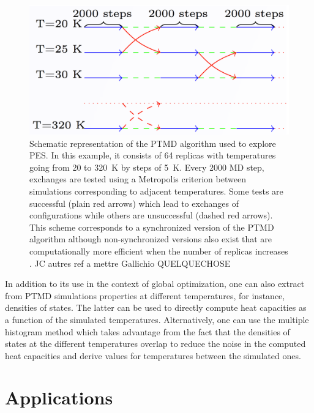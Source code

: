 \documentclass[]{interact}
\theoremstyle{plain}%
\theoremstyle{definition}
\theoremstyle{remark}
\begin{document}
\begin{figure}
\begin{center}
\includegraphics[width=12cm]{ptmd.png}
\end{center}
\caption{Schematic representation of the PTMD algorithm used to explore PES. In this example, it consists of 64 replicas with
temperatures going from 20 to 320~K by steps of 5~K. Every 2000 MD step, exchanges are tested using a Metropolis criterion between
simulations corresponding to adjacent temperatures. Some tests are successful (plain red arrows) which lead to exchanges of configurations
while others are unsuccessful (dashed red arrows). This scheme corresponds to a synchronized version of the PTMD algorithm although
non-synchronized versions also exist that are computationally more efficient when the number of replicas increases \cite{Bussi2008c}. JC autres ref a mettre Gallichio QUELQUECHOSE }
\label{ptmd}
\end{figure}

In addition to its use in the context of global optimization, one can also extract from PTMD simulations properties at different temperatures,
for instance, densities of states. The latter can be used to directly compute heat capacities as a function of the simulated temperatures.
Alternatively, one can use the multiple histogram method \cite{Labastie1990} which takes advantage from the fact that the densities of
states at the different temperatures overlap to reduce the noise in the computed heat capacities and derive values for temperatures between
the  simulated ones.
  
\section{Applications} \label{appl}
\end{document}

